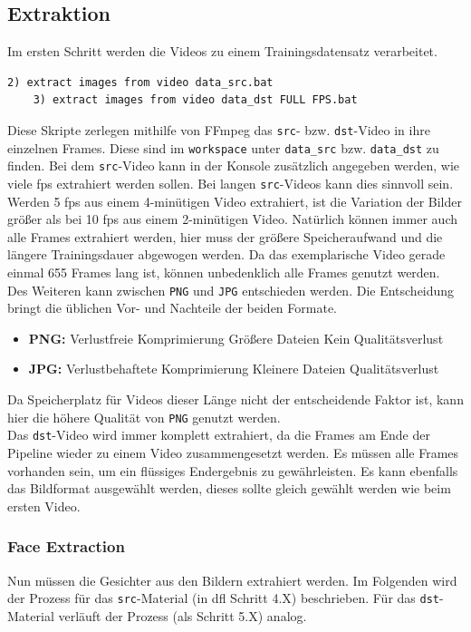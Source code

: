 \subsection{Extraktion}\label{subsec:extraction}
Im ersten Schritt werden die Videos zu einem Trainingsdatensatz verarbeitet.
\begin{lstlisting}[label={lst:extraction-1},numbers=none]
    2) extract images from video data_src.bat
    3) extract images from video data_dst FULL FPS.bat
\end{lstlisting}
Diese Skripte zerlegen mithilfe von FFmpeg das \texttt{src}- bzw. \texttt{dst}-Video in ihre einzelnen Frames.
Diese sind im \texttt{workspace} unter \texttt{data\_src} bzw. \texttt{data\_dst} zu finden.
Bei dem \texttt{src}-Video kann in der Konsole zusätzlich angegeben werden, wie viele \gls{fps} extrahiert werden sollen.
Bei langen \texttt{src}-Videos kann dies sinnvoll sein.
Werden 5 \gls{fps} aus einem 4-minütigen Video extrahiert, ist die Variation der Bilder größer als bei 10 \gls{fps} aus einem 2-minütigen Video.
Natürlich können immer auch alle Frames extrahiert werden, hier muss der größere Speicheraufwand und die längere Trainingsdauer abgewogen werden.
Da das exemplarische Video gerade einmal 655 Frames lang ist, können unbedenklich alle Frames genutzt werden.
Des Weiteren kann zwischen \texttt{PNG} und \texttt{JPG} entschieden werden.
Die Entscheidung bringt die üblichen Vor- und Nachteile der beiden Formate.
\begin{itemize}
    \item \textbf{PNG:} Verlustfreie Komprimierung \rightarrow Größere Dateien \rightarrow Kein Qualitätsverlust
    \item \textbf{JPG:} Verlustbehaftete Komprimierung \rightarrow Kleinere Dateien \rightarrow Qualitätsverlust
\end{itemize}
Da Speicherplatz für Videos dieser Länge nicht der entscheidende Faktor ist, kann hier die höhere Qualität von \texttt{PNG} genutzt werden.\\
Das \texttt{dst}-Video wird immer komplett extrahiert, da die Frames am Ende der Pipeline wieder zu einem Video zusammengesetzt werden.
Es müssen alle Frames vorhanden sein, um ein flüssiges Endergebnis zu gewährleisten.
Es kann ebenfalls das Bildformat ausgewählt werden, dieses sollte gleich gewählt werden wie beim ersten Video.

\subsubsection{Face Extraction}
Nun müssen die Gesichter aus den Bildern extrahiert werden.
Im Folgenden wird der Prozess für das \texttt{src}-Material (in \gls{dfl} Schritt 4.X) beschrieben.
Für das \texttt{dst}-Material verläuft der Prozess (als Schritt 5.X) analog.

